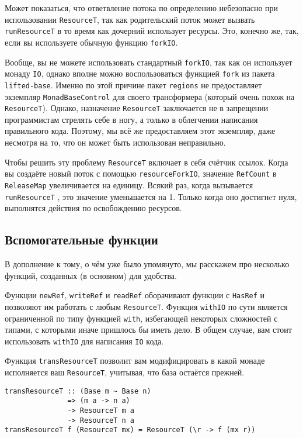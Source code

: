 {Может показаться, что ответвление потока по определению небезопасно при использовании 
\lstinline'ResourceT', так как родительский поток может вызвать
\lstinline'runResourceT' в то время
как дочерний использует ресурсы. Это, конечно же, так, если вы используете обычную
функцию \lstinline'forkIO'.

\begin{remark}
Вообще, вы не можете использовать стандартный \lstinline'forkIO', так как он
использует монаду
\lstinline{IO}, однако вполне можно воспользоваться функцией \lstinline'fork' из пакета \lstinline{lifted-base}.
Именно по этой причине пакет \lstinline{regions} не предоставляет экземпляр \lstinline'MonadBaseControl' для своего
трансформера (который очень похож на \lstinline'ResourceT'). Однако, назначение
\lstinline'ResourceT' заключается не в запрещении 
программистам стрелять себе в ногу, а только в облегчении написания
правильного кода. Поэтому, мы всё же предоставляем этот экземпляр, даже несмотря на то, что он может быть
использован неправильно. 
\end{remark}

Чтобы решить эту проблему \lstinline'ResourceT' включает в себя
счётчик ссылок. Когда вы создаёте новый поток с помощью \lstinline'resourceForkIO',
значение \lstinline'RefCount' в \lstinline'ReleaseMap' увеличивается на единицу. Всякий раз, когда вызывается 
\lstinline'runResourceT'
, это значение уменьшается на 1. Только когда оно достигнeт нуля, выполнятся
действия по освобождению ресурсов.
 
\subsection{Вспомогательные функции}

В дополнение к тому, о чём уже было упомянуто, мы расскажем про несколько функций, созданных (в основном) для удобства.
   
Функции \verb=newRef=, \verb=writeRef= и \verb=readRef= оборачивают
функции с \lstinline'HasRef' и позволяют им работать с любым \lstinline'ResourceT'.
Функция \verb=withIO= по сути является ограниченной по типу функцией \verb=with=, избегающей некоторых сложностей с типами, с которыми иначе пришлось бы иметь дело.
В общем случае, вам стоит использовать \lstinline'withIO' для написания \lstinline{IO} кода.

Функция \verb=transResourceT= позволит вам модифицировать в какой монаде исполняется ваш
\verb=ResourceT=, учитывая, что база остаётся прежней.
\begin{lstlisting}
transResourceT :: (Base m ~ Base n)
               => (m a -> n a)
               -> ResourceT m a
               -> ResourceT n a
transResourceT f (ResourceT mx) = ResourceT (\r -> f (mx r))
\end{lstlisting}  

}
